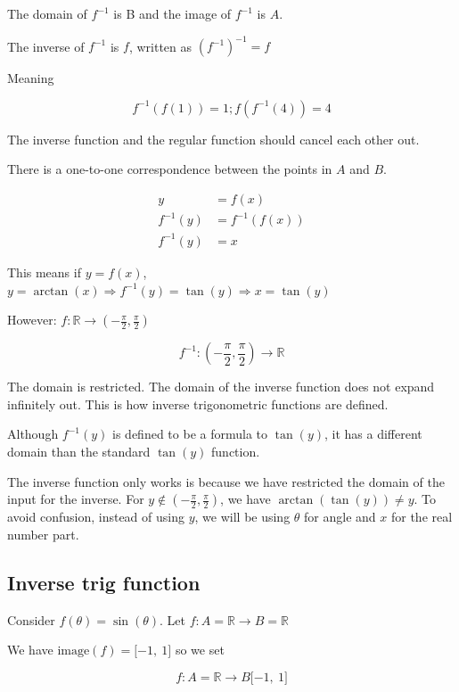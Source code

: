 \documentclass[12pt]{article}
\theoremstyle{plain}
\theoremstyle{remark}
\theoremstyle{definition}
\begin{document}
The domain of \(f^{- 1}\) is B and the image of \(f^{- 1}\) is \(A\).

The inverse of \(f^{- 1}\) is \(f\), written as
\(\left( f^{- 1} \right)^{- 1} = f\)

Meaning

\[f^{- 1}\left( f(1) \right) = 1;f\left( f^{- 1}(4) \right) = 4\]

The inverse function and the regular function should cancel each other
out.

There is a one-to-one correspondence between the points in \(A\) and
\(B\).

\begin{align*}
y &= f(x) \\
f^{- 1}(y) &= f^{- 1}\left( f(x) \right) \\
f^{- 1}(y) &= x
\end{align*}


This means if \(y = f(x)\),
\(y = \arctan(x) \Rightarrow f^{- 1}(y) = \tan(y) \Rightarrow x = \tan(y)\)

However:
\(f\mathbb{:R \rightarrow}\left( - \frac{\pi}{2},\frac{\pi}{2} \right)\)

\[f^{- 1}:\left( - \frac{\pi}{2},\frac{\pi}{2} \right)\mathbb{\rightarrow R}\]

The domain is restricted. The domain of the inverse function does not
expand infinitely out. This is how inverse trigonometric functions are
defined.

Although \(f^{- 1}(y)\) is defined to be a formula to \(\tan(y)\), it
has a different domain than the standard \(\tan(y)\) function.

The inverse function only works is because we have restricted the domain
of the input for the inverse. For
\(y \notin \left( - \frac{\pi}{2},\frac{\pi}{2} \right)\), we have
\(\arctan\left( \tan(y) \right) \neq y\). To avoid confusion, instead of
using \(y\), we will be using \(\theta\) for angle and \(x\) for the
real number part.


\subsection{Inverse trig function}

Consider \(f(\theta) = \sin(\theta)\). Let
\(f:A\mathbb{= R \rightarrow}B\mathbb{= R}\)

We have \(\text{image}(f) = \lbrack - 1,\ 1\rbrack\) so we set

\[f:A\mathbb{= R \rightarrow}B\lbrack - 1,\ 1\rbrack\]
\end{document}
